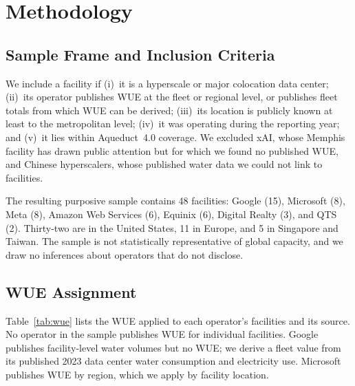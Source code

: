 \documentclass[conference,10pt]{IEEEtran}
\begin{document}
\section{Methodology}
\label{sec:methodology}

\subsection{Sample Frame and Inclusion Criteria}

We include a facility if (i)~it is a hyperscale or major colocation data
center; (ii)~its operator publishes WUE at the fleet or regional level, or
publishes fleet totals from which WUE can be derived; (iii)~its location is
publicly known at least to the metropolitan level; (iv)~it was operating
during the reporting year; and (v)~it lies within Aqueduct~4.0 coverage. We
excluded xAI, whose Memphis facility has drawn public attention but for
which we found no published WUE, and Chinese hyperscalers, whose published
water data we could not link to facilities.

The resulting purposive sample contains 48 facilities: Google (15),
Microsoft (8), Meta (8), Amazon Web Services (6), Equinix (6), Digital
Realty (3), and QTS (2). Thirty-two are in the United States, 11 in Europe,
and 5 in Singapore and Taiwan. The sample is not statistically
representative of global capacity, and we draw no inferences about operators
that do not disclose.

\subsection{WUE Assignment}

Table~\ref{tab:wue} lists the WUE applied to each operator's facilities and
its source. No operator in the sample publishes WUE for individual
facilities. Google publishes facility-level water volumes but no WUE; we
derive a fleet value from its published 2023 data center water consumption
and electricity use. Microsoft publishes WUE by region, which we apply by
facility location.
\end{document}
